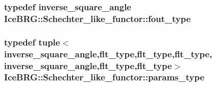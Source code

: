 \hypertarget{classIceBRG_1_1Schechter__like__functor_a90c760c2efcd3ae2b3a7f733672b18ed}{
\subsubsection[{fout\-\_\-type}]{\setlength{\rightskip}{0pt plus 5cm}typedef {\bf inverse\-\_\-square\-\_\-angle} {\bf Ice\-B\-R\-G\-::\-Schechter\-\_\-like\-\_\-functor\-::fout\-\_\-type}}}\label{classIceBRG_1_1Schechter__like__functor_a90c760c2efcd3ae2b3a7f733672b18ed}
\hypertarget{classIceBRG_1_1Schechter__like__functor_a5a7c7522b680f34ea2004184ffd099f7}{
\subsubsection[{params\-\_\-type}]{\setlength{\rightskip}{0pt plus 5cm}typedef tuple$<${\bf inverse\-\_\-square\-\_\-angle},{\bf flt\-\_\-type},{\bf flt\-\_\-type},{\bf flt\-\_\-type}, {\bf inverse\-\_\-square\-\_\-angle},{\bf flt\-\_\-type},{\bf flt\-\_\-type}$>$ {\bf Ice\-B\-R\-G\-::\-Schechter\-\_\-like\-\_\-functor\-::params\-\_\-type}}}\label{classIceBRG_1_1Schechter__like__functor_a5a7c7522b680f34ea2004184ffd099f7}


